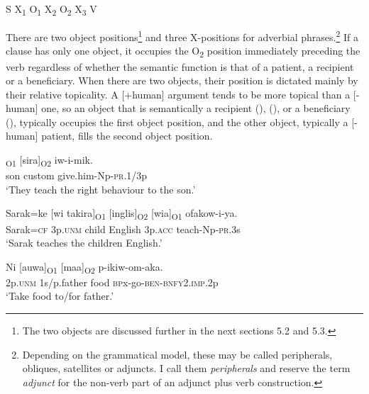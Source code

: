 S    X\textsubscript{1}  O\textsubscript{1}  X\textsubscript{2}  O\textsubscript{2}  X\textsubscript{3}  V

There are two object positions\footnote{The two objects are discussed further in the next sections 5.2 and 5.3.}  and three X-positions for adverbial phrases.\footnote{Depending on the grammatical model, these may be called peripherals, obliques, satellites or adjuncts. I call them \textit{peripherals} and reserve the term \textit{adjunct} for the non-verb part of an adjunct plus verb construction.}  If a clause has only one object, it occupies the O\textsubscript{2} position immediately preceding the verb regardless of whether the semantic function is that of a patient, a recipient or a beneficiary. When there are two objects, their position is dictated mainly by their relative topicality. A [+human] argument tends to be more topical than a [\nobreakdash-human] one, so an object that is semantically a recipient (), (), or a beneficiary (), typically occupies the first object position, and the other object, typically a [\nobreakdash-human] patient, fills the second object position. 

\ea%
\label{ex:x928}
\gll [Muuka]\textsubscript{O1}  [sira]\textsubscript{O2}  iw-i-mik. \\
     son  custom  give.him-Np-\textsc{pr}.1/3p \\
\glt `They teach the right behaviour to the son.'
\z

\ea%
\label{ex:x933}
\gll Sarak=ke  [wi  takira]\textsubscript{O1}  [inglis]\textsubscript{O2}  [wia]\textsubscript{O1}  ofakow-i-ya.{\footnotemark} \\
      Sarak=\textsc{cf}  3p.\textsc{unm}  child  English  3p.\textsc{acc}  teach-Np-\textsc{pr}.3s \\
\glt `Sarak teaches the children English.'
\z


\ea%
\label{ex:x916}
\gll Ni  [auwa]\textsubscript{O1}  [maa]\textsubscript{O2}  p-ikiw-om-aka.  \\
      2p.\textsc{unm}  1s/p.father  food  \textsc{bp}x-go-\textsc{ben}-\textsc{bnfy}2.\textsc{imp}.2p \\
\glt `Take food to/for father.'
\z

